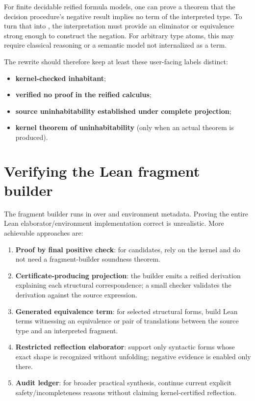 \documentclass[10pt,letterpaper,oneside]{report}
\newcommand{\code}[1]{\texttt{\detokenize{#1}}}
\newcommand{\term}[1]{\textbf{#1}}
\begin{document}
For finite decidable reified formula models, one can prove a theorem that the decision procedure's negative result implies no term of the interpreted type. To turn that into \code{T -> False}, the interpretation must provide an eliminator or equivalence strong enough to construct the negation. For arbitrary type atoms, this may require classical reasoning or a semantic model not internalized as a term.

The rewrite should therefore keep at least these user-facing labels distinct:

\begin{itemize}
  \item \term{kernel-checked inhabitant};
  \item \term{verified no proof in the reified calculus};
  \item \term{source uninhabitability established under complete projection};
  \item \term{kernel theorem of uninhabitability} (only when an actual theorem is produced).
\end{itemize}

\section{Verifying the Lean fragment builder}

The fragment builder runs in \code{MetaM} over \code{Expr} and environment metadata. Proving the entire Lean elaborator/environment implementation correct is unrealistic. More achievable approaches are:

\begin{enumerate}
  \item \term{Proof by final positive check}: for candidates, rely on the kernel and do not need a fragment-builder soundness theorem.
  \item \term{Certificate-producing projection}: the builder emits a reified derivation explaining each structural correspondence; a small checker validates the derivation against the source expression.
  \item \term{Generated equivalence term}: for selected structural forms, build Lean terms witnessing an equivalence or pair of translations between the source type and an interpreted fragment.
  \item \term{Restricted reflection elaborator}: support only syntactic forms whose exact \code{Expr} shape is recognized without unfolding; negative evidence is enabled only there.
  \item \term{Audit ledger}: for broader practical synthesis, continue current explicit safety/incompleteness reasons without claiming kernel-certified reflection.
\end{enumerate}
\end{document}
